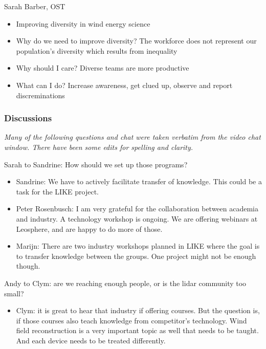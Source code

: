 Sarah Barber, OST

\begin{itemize}
	\item Improving diversity in wind energy science
	\item Why do we need to improve diversity? The workforce does not represent
	      our population's diversity which results from inequality
	\item Why should I care? Diverse teams are more productive
	\item What can I do? Increase awareness, get clued up, observe and report
	      discreminations
\end{itemize}

\subsubsection{Discussions}

\emph{Many of the following questions and chat were taken verbatim from
	the video chat window. There have been some edits for spelling and
clarity.}

Sarah to Sandrine: How should we set up those programs?

\begin{itemize}
	\item Sandrine: We have to actively facilitate transfer of knowledge. This
	      could be a task for the LIKE project.
	\item Peter Rosenbusch: I am very grateful for the collaboration between
	      academia and industry. A technology workshop is ongoing. We are
	      offering webinars at Leosphere, and are happy to do more of those.
	\item Marijn: There are two industry workshops planned in LIKE where the
	      goal is to transfer knowledge between the groups. One project might
	      not be enough though.
\end{itemize}

Andy to Clym: are we reaching enough people, or is the lidar community
too small?

\begin{itemize}
	\item Clym: it is great to hear that industry if offering courses. But the
	      question is, if those courses also teach knowledge from competitor's
	      technology. Wind field reconstruction is a very important topic as
	      well that needs to be taught. And each device needs to be treated
	      differently.
\end{itemize}


